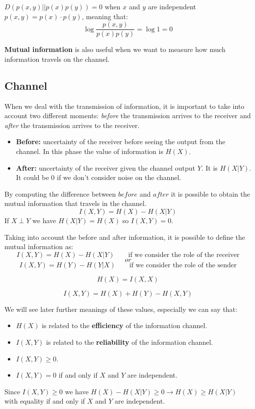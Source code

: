$D(p(x,y)||p(x)p(y)) = 0$ when $x$ and $y$ are independent $p(x,y) = p(x)\cdot p(y)$, meaning that: 
$$\log \frac{p(x,y)}{p(x)p(y)} = \log 1 = 0 $$

\textbf{Mutual information} is also useful when we want to measure how much information travels on the channel.
\subsection{Channel}
When we deal with the transmission of information, it is important to take into account two different moments: \textit{before} the transmission arrives to the receiver and \textit{after} the transmission arrives to the receiver. 
\begin{itemize}
	\item \textbf{Before:} uncertainty of the receiver before seeing the output from the channel. In this phase the value of information is $H(X)$.
	\item \textbf{After:} uncertainty of the receiver given the channel output $Y$. It is $H(X|Y)$. It could be 0 if we don't consider noise on the channel.
\end{itemize}
By computing the difference between $before$ and $after$ it is possible to obtain the mutual information that travels in the channel.
$$I(X,Y) = H(X) - H(X|Y)$$
If $X \perp Y$ we have $H(X|Y) = H(X)$ so $I(X,Y) = 0$. 
\begin{thm} Taking into account the before and after information, it is possible to define the mutual information as:
	$$I(X,Y) = H(X) - H(X|Y) \qquad \text{if we consider the role of the receiver}$$
	$$or$$
	$$I(X,Y) = H(Y) - H(Y|X) \qquad \text{if we consider the role of the sender}$$
\end{thm}
\begin{thm}
	$$H(X) = I(X,X)$$
\end{thm}
\begin{thm}
	$$I(X,Y) = H(X) + H(Y) - H(X,Y)$$
\end{thm}
We will see later further meanings of these values, especially we can say that:
\begin{itemize}
	\item $H(X)$ is related to the \textbf{efficiency} of the information channel.
	\item $I(X,Y)$ is related to the \textbf{reliability} of the information channel.
	\item $I(X,Y) \geq 0$.
	\item $I(X,Y) = 0$ if and only if $X$ and $Y$ are independent.
\end{itemize}
Since $I(X,Y) \geq 0$ we have $H(X) - H(X|Y) \geq 0 \rightarrow H(X) \geq H(X|Y)$  with equality if and only if $X$ and $Y$ are independent.

